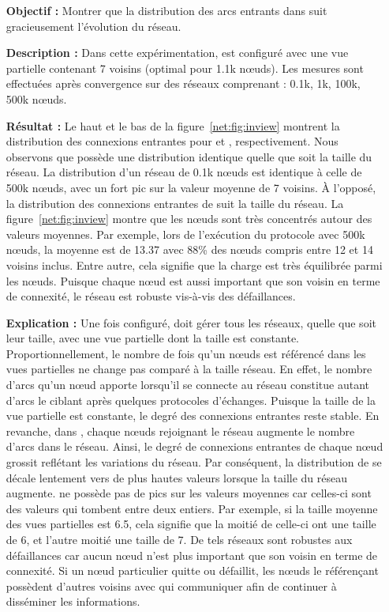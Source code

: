 \begin{itemize}
\item [\textbf{Objectif :}] Montrer que la distribution des arcs entrants dans
  \SPRAY suit gracieusement l'évolution du réseau.
\item [\textbf{Description :}] Dans cette expérimentation, \CYCLON est configuré
  avec une vue partielle contenant 7 voisins (optimal pour 1.1k nœuds). Les
  mesures sont effectuées après convergence sur des réseaux comprenant : 0.1k,
  1k, 100k, 500k nœuds.
\item [\textbf{Résultat :}] Le haut et le bas de la figure~\ref{net:fig:inview}
  montrent la distribution des connexions entrantes pour \CYCLON et \SPRAY,
  respectivement. Nous observons que \CYCLON possède une distribution identique
  quelle que soit la taille du réseau. La distribution d'un réseau de 0.1k nœuds
  est identique à celle de 500k nœuds, avec un fort pic sur la valeur moyenne de
  7 voisins. À l'opposé, la distribution des connexions entrantes de \SPRAY suit
  la taille du réseau. La figure~\ref{net:fig:inview} montre que les nœuds sont
  très concentrés autour des valeurs moyennes. Par exemple, lors de l'exécution
  du protocole \SPRAY avec 500k nœuds, la moyenne est de 13.37 avec 88\% des
  nœuds compris entre 12 et 14 voisins inclus. Entre autre, cela signifie que la
  charge est très équilibrée parmi les nœuds. Puisque chaque nœud est aussi
  important que son voisin en terme de connexité, le réseau est robuste
  vis-à-vis des défaillances.
\item [\textbf{Explication :}] Une fois configuré, \CYCLON doit gérer tous les
  réseaux, quelle que soit leur taille, avec une vue partielle dont la taille
  est constante. Proportionnellement, le nombre de fois qu'un nœuds est
  référencé dans les vues partielles ne change pas comparé à la taille
  réseau. En effet, le nombre d'arcs qu'un nœud apporte lorsqu'il se connecte au
  réseau constitue autant d'arcs le ciblant après quelques protocoles
  d'échanges. Puisque la taille de la vue partielle est constante, le degré des
  connexions entrantes reste stable. En revanche, dans \SPRAY, chaque nœuds
  rejoignant le réseau augmente le nombre d'arcs dans le réseau. Ainsi, le degré
  de connexions entrantes de chaque nœud grossit reflétant les variations du
  réseau. Par conséquent, la distribution de \SPRAY se décale lentement vers de
  plus hautes valeurs lorsque la taille du réseau augmente. \SPRAY ne possède
  pas de pics sur les valeurs moyennes car celles-ci sont des valeurs qui
  tombent entre deux entiers. Par exemple, si la taille moyenne des vues
  partielles est 6.5, cela signifie que la moitié de celle-ci ont une taille de
  6, et l'autre moitié une taille de 7. De tels réseaux sont robustes aux
  défaillances car aucun nœud n'est plus important que son voisin en terme de
  connexité. Si un nœud particulier quitte ou défaillit, les nœuds le
  référençant possèdent d'autres voisins avec qui communiquer afin de continuer
  à disséminer les informations.
\end{itemize}

